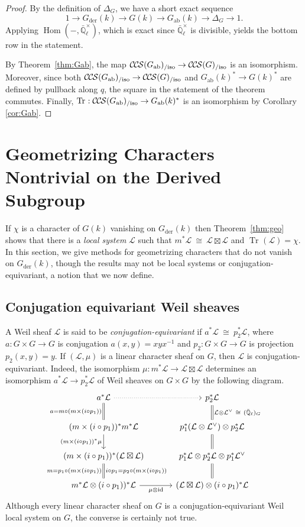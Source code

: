 \documentclass[10pt]{amsart}
\theoremstyle{plain}
\theoremstyle{definition}
\newcommand{\EE}{\mathbb{\bar Q}_\ell}
\newcommand{\EEx}{\EE^\times}
\DeclareMathOperator{\Hom}{Hom}
\DeclareMathOperator{\id}{id}
\newcommand{\der}{_{\operatorname{der}}}
\newcommand{\ab}{_{\operatorname{ab}}}
\newcommand{\iso}{{\ \cong\ }}
\DeclareMathOperator{\Tr}{Tr}
\newcommand{\TrFrob}[1]{\Tr_{#1}}
\newcommand{\cs}[1]{{\mathcal{#1}}}
\newcommand{\CCS}{{\mathcal{C\hskip-.8pt C\hskip-0.8pt S}}}
\newcommand{\CCSiso}[1]{\CCS(#1)_{/\text{iso}}}
\begin{document}
\begin{proof}
By the definition of $\Delta_G$, we have a short exact sequence
\[
1 \to G\der(k) \to G(k) \to G\ab(k) \to \Delta_G \to 1.
\]
Applying $\Hom(-, \EEx)$, which is exact since $\EEx$ is divisible, yields the bottom row in the statement.

By Theorem~\ref{thm:Gab}, the map $\CCSiso{G\ab} \to \CCSiso{G}$ is an isomorphism.
Moreover, since both $\CCSiso{G\ab} \to \CCSiso{G}$ and $G\ab(k)^* \to G(k)^*$ are
defined by pullback along $q$, the square in the statement of the theorem commutes.
Finally, $\TrFrob{} : \CCSiso{G\ab} \to G\ab(k)^*$ is an isomorphism by Corollary \ref{cor:Gab}.
\end{proof}

\section{Geometrizing Characters Nontrivial on the Derived Subgroup} \label{sec:badchar}

If $\chi$ is a character of $G(k)$ vanishing on $G\der(k)$ then Theorem~\ref{thm:geo} shows that there is a \emph{local system} $\cs{L}$ such that $m^*\cs{L} \iso \cs{L}\boxtimes\cs{L}$ and $\TrFrob{}(\cs{L}) = \chi$.
In this section, we give methods for geometrizing characters that do not vanish on $G\der(k)$, though the results may not be local systems or conjugation-equivariant, a notion that we now define.

\subsection{Conjugation equivariant Weil sheaves}\label{ssec:equivariant}

A Weil sheaf $\cs{L}$ is said to be \emph{conjugation-equivariant} if $a^*\cs{L} \iso p_2^*\cs{L}$, where  $a : G\times G\to G$ is conjugation $a(x,y)=xyx^{-1}$ and $p_2: G\times G\to G$ is projection $p_2(x,y)=y$. 
If $(\cs{L},\mu)$ is a linear character sheaf on $G$, then $\cs{L}$ is conjugation-equivariant. Indeed,
the isomorphism $\mu : m^*\cs{L} \to \cs{L}\boxtimes\cs{L}$ determines an isomorphism $a^*\cs{L} \to p_2^*\cs{L}$ of Weil sheaves on $G\times G$ by the following diagram.
\[
\begin{tikzcd}[column sep = 30]
a^*\cs{L} \arrow[equal]{d}[swap]{a= m\circ (m\times (i\circ p_1))} \arrow[dotted]{r} & p_2^*\cs{L}  \\
(m\times (i\circ p_1))^* m^*\cs{L} \arrow{d}[swap]{(m\times (i\circ p_1))^*\mu}  & p_1^*(\cs{L} \otimes \cs{L}^\vee) \otimes p_2^*\cs{L} \arrow[equal]{u}[swap]{\cs{L}\otimes \cs{L}^\vee \iso (\EE)_{G}} \\
(m\times (i\circ p_1))^* ( \cs{L}\boxtimes\cs{L}) \arrow[equal]{d}{i\circ p_1 = p_2\circ(m\times(i\circ p_1))}[swap]{m= p_1\circ(m\times(i\circ p_1))}  & p_1^*\cs{L} \otimes p_2^*\cs{L} \otimes p_1^*\cs{L}^\vee \arrow[equal]{u} \\
m^*\cs{L}\otimes (i\circ p_1))^*\cs{L} \arrow{r}[swap]{\mu \otimes \id} & (\cs{L}\boxtimes\cs{L})\otimes (i\circ p_1)^*\cs{L} \arrow[equal]{u}
\end{tikzcd}
\]
Although every linear character sheaf on $G$ is a conjugation-equivariant Weil local system on $G$, the converse is certainly not true. 
\end{document}
